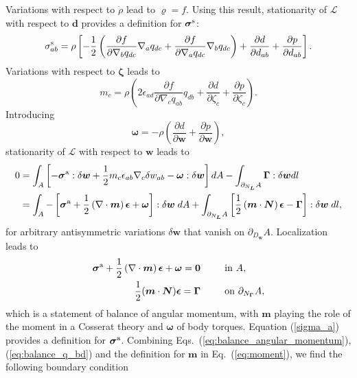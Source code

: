\documentclass[12pt]{iopart}
\newcommand\eqref[1]{(\ref{#1})}
\begin{document}
	Variations with respect to $\dot{\rho}$ lead to  $\varrho  = f$.
	Using this result, stationarity of $\mathcal{L}$ with respect to $\bm{d}$ provides a definition for $\bm{\sigma}^{\rm s}$:
	\begin{eqnarray} 
		\sigma^{\rm s}_{ab} = \rho\left[-\frac{1}{2} \left(\frac{\partial  f}{\partial \nabla_b q_{dc}} \nabla_a q_{dc}+ \frac{\partial  f}{\partial \nabla_a q_{dc}} \nabla_b q_{dc}\right) +  \frac{\partial  d}{\partial d_{ab}}+  \frac{\partial  p}{\partial d_{ab}}\right].
		\label{eq:sym_stress}
	\end{eqnarray}
	Variations with respect to $\bm{\zeta}$ leads to
	\begin{equation}
		\label{eq:moment}
		m_c =\rho  \left(2 \epsilon_{ad} \frac{\partial  f}{\partial \nabla_c q_{ab}} q_{db} + \frac{\partial  d}{\partial \zeta_c} + \frac{\partial  p}{\partial \zeta_c}\right).
	\end{equation}
	Introducing 
	\begin{equation}
		\bm{\omega} = - \rho \left(\frac{\partial  d}{\partial \bm{w}} + \frac{\partial  p}{\partial \bm{w}}\right),
	\end{equation}
	stationarity of $\mathcal{L}$ with respect to $\bm{w}$ leads to
	\begin{eqnarray} 
		0&=\int_A \left[-\bm{\sigma}^{\rm a} :\delta\bm{w} + \frac{1}{2} {m}_c \epsilon_{ab} \nabla_c \delta w_{ab}  - \bm{\omega} :\delta \bm{w} \right] dA - \int_{\partial_{N_{\bm{L}}}A} \bm{\Gamma}:\delta\bm{w} dl\nonumber \\
		&=\int_A -\left[\bm{\sigma}^{\rm a}  + \frac{1}{2} \left(\nabla \cdot \bm{m}\right) \bm{\epsilon} +  \bm{\omega}  \right] : \delta\bm{w} \;dA + \int_{\partial_{N_{\bm{L}}}A} \left[\frac{1}{2}\left(\bm{m}\cdot\bm{N}\right) \bm{\epsilon}- \bm{\Gamma}\right]:\delta\bm{w}\; dl,
	\end{eqnarray}
for arbitrary antisymmetric variations $\delta\bm{w}$ that vanish on $\partial_{D_{\bm{w}}} A$. Localization leads to 
	\begin{eqnarray} 
		\label{sigma_a}
		\bm{\sigma}^{\rm a} + \frac{1}{2}\left(\nabla\cdot\bm{m}\right)\bm{\epsilon} +  \bm{\omega} =  \bm{0}& \hspace*{25pt} \text{in } A, \\ 
		\frac{1}{2}(\bm{m}\cdot\bm{N})\bm{\epsilon} =  \bm{\Gamma} & \hspace*{25pt} \text{on } \partial_{N_{\bm{\Gamma}}} A, 	\label{eq:balance_angular_momentum}
	\end{eqnarray}
	which is a statement of balance of angular momentum, with $\bm{m}$ playing the role of the moment in a Cosserat theory \cite{cosserat1896theorie} and $\bm{\omega}$ of body torques. Equation \eqref{sigma_a} provides a definition for $\bm{\sigma}^{\rm a}$. Combining Eqs.~\eqref{eq:balance_angular_momentum}, \eqref{eq:balance_q_bd} and the  definition for $\bm{m}$ in Eq.~\eqref{eq:moment}, we find the following boundary condition
\end{document}
